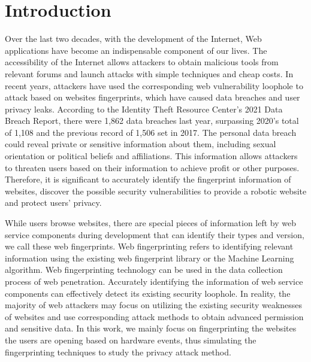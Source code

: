 \documentclass[conference]{IEEEtran}
\begin{document}
\section{Introduction}
Over the last two decades, with the development of the Internet, Web applications have become an indispensable component of our lives. The accessibility of the Internet allows attackers to obtain malicious tools from relevant forums and launch attacks with simple techniques and cheap costs. In recent years, attackers have used the corresponding web vulnerability loophole to attack based on websites fingerprints, which have caused data breaches and user privacy leaks. According to the Identity Theft Resource Center's 2021 Data Breach Report, there were 1,862 data breaches last year, surpassing 2020's total of 1,108 and the previous record of 1,506 set in 2017. \cite{b7} The personal data breach could reveal private or sensitive information about them, including sexual orientation or political beliefs and affiliations. This information allows attackers to threaten users based on their information to achieve profit or other purposes. Therefore, it is significant to accurately identify the fingerprint information of websites, discover the possible security vulnerabilities to provide a robotic website and protect users’ privacy.

While users browse websites, there are special pieces of information left by web service components during development that can identify their types and version, we call these web fingerprints. Web fingerprinting refers to identifying relevant information using the existing web fingerprint library or the Machine Learning algorithm. Web fingerprinting technology can be used in the data collection process of web penetration. Accurately identifying the information of web service components can effectively detect its existing security loophole. In reality, the majority of web attackers may focus on utilizing the existing security weaknesses of websites and use corresponding attack methods to obtain advanced permission and sensitive data. In this work, we mainly focus on fingerprinting the websites the users are opening based on hardware events, thus simulating the fingerprinting techniques to study the privacy attack method.
\end{document}
